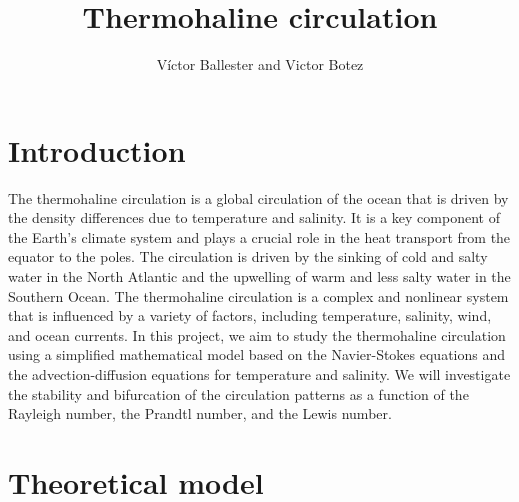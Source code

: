 \documentclass{article}
\title{Thermohaline circulation}
\author{Víctor Ballester and Victor Botez}
\date{\parbox{\linewidth}{\centering
Computational Fluid Dynamics\endgraf
M2 - Applied and Theoretical Mathematics\endgraf
Université Paris-Dauphine, PSL\endgraf
\today}}
\begin{document}
\maketitle

\section{Introduction}
The thermohaline circulation is a global circulation of the ocean that is driven by the density differences due to temperature and salinity. It is a key component of the Earth's climate system and plays a crucial role in the heat transport from the equator to the poles. The circulation is driven by the sinking of cold and salty water in the North Atlantic and the upwelling of warm and less salty water in the Southern Ocean. The thermohaline circulation is a complex and nonlinear system that is influenced by a variety of factors, including temperature, salinity, wind, and ocean currents. In this project, we aim to study the thermohaline circulation using a simplified mathematical model based on the Navier-Stokes equations and the advection-diffusion equations for temperature and salinity. We will investigate the stability and bifurcation of the circulation patterns as a function of the Rayleigh number, the Prandtl number, and the Lewis number.

\section{Theoretical model}
\end{document}
